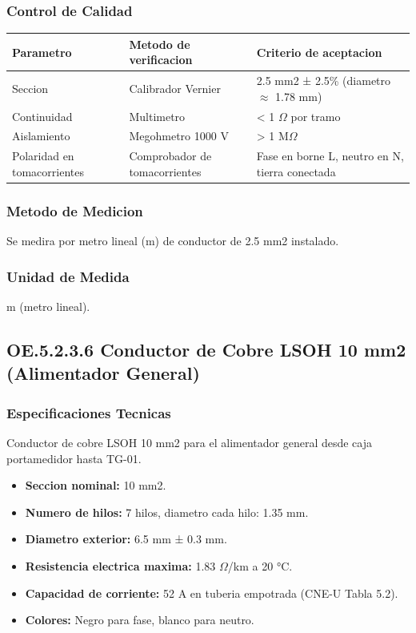 \subsubsection{Control de Calidad}

\begin{longtable}{L{4.5cm} L{4.5cm} L{4.5cm}}
\toprule
\textbf{Parametro} & \textbf{Metodo de verificacion} & \textbf{Criterio de aceptacion} \\
\midrule
Seccion & Calibrador Vernier & 2.5 mm2 ± 2.5\% (diametro $\approx$ 1.78 mm) \\
Continuidad & Multimetro & < 1 $\Omega$ por tramo \\
Aislamiento & Megohmetro 1000 V & > 1 M$\Omega$ \\
Polaridad en tomacorrientes & Comprobador de tomacorrientes & Fase en borne L, neutro en N, tierra conectada \\
\bottomrule
\end{longtable}

\subsubsection{Metodo de Medicion}

Se medira por metro lineal (m) de conductor de 2.5 mm2 instalado.

\subsubsection{Unidad de Medida}

m (metro lineal).

\subsection{OE.5.2.3.6 Conductor de Cobre LSOH 10 mm2 (Alimentador General)}

\subsubsection{Especificaciones Tecnicas}

Conductor de cobre LSOH 10 mm2 para el alimentador general desde caja portamedidor hasta TG-01.

\begin{itemize}[nosep]
  \item \textbf{Seccion nominal:} 10 mm2.
  \item \textbf{Numero de hilos:} 7 hilos, diametro cada hilo: 1.35 mm.
  \item \textbf{Diametro exterior:} 6.5 mm ± 0.3 mm.
  \item \textbf{Resistencia electrica maxima:} 1.83 $\Omega$/km a 20 °C.
  \item \textbf{Capacidad de corriente:} 52 A en tuberia empotrada (CNE-U Tabla 5.2).
  \item \textbf{Colores:} Negro para fase, blanco para neutro.
\end{itemize}

